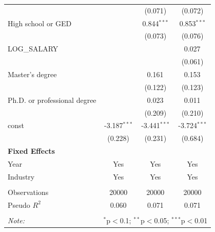 \begin{table}[!htbp]
\begin{tabular}{@{\extracolsep{5pt}}lccc}
& & (0.071) & (0.072) \\
 High school or GED & & 0.844$^{***}$ & 0.853$^{***}$ \\
& & (0.073) & (0.076) \\
 LOG_SALARY & & & 0.027$^{}$ \\
& & & (0.061) \\
 Master's degree & & 0.161$^{}$ & 0.153$^{}$ \\
& & (0.122) & (0.123) \\
 Ph.D. or professional degree & & 0.023$^{}$ & 0.011$^{}$ \\
& & (0.209) & (0.210) \\
 const & -3.187$^{***}$ & -3.441$^{***}$ & -3.724$^{***}$ \\
& (0.228) & (0.231) & (0.684) \\
 \textbf{Fixed Effects} &  &  &  \\
 Year & Yes & Yes & Yes \\
 Industry & Yes & Yes & Yes \\
\hline \\[-1.8ex]
 Observations & 20000 & 20000 & 20000 \\
 Pseudo $R^2$ & 0.060 & 0.071 & 0.071 \\
\hline
\hline \\[-1.8ex]
\textit{Note:} & \multicolumn{3}{r}{$^{*}$p$<$0.1; $^{**}$p$<$0.05; $^{***}$p$<$0.01} \\
\end{tabular}
\end{table}